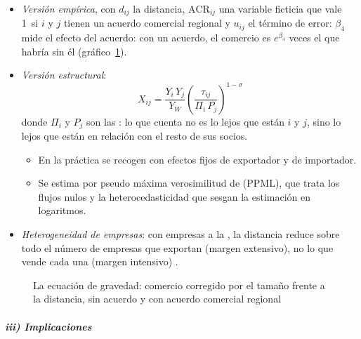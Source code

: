 \documentclass[11pt]{article}
\begin{document}
\begin{itemize}
\item \emph{Versión empírica}, con $d_{ij}$ la distancia, $\mathrm{ACR}_{ij}$ una variable ficticia que vale 1~si $i$ y $j$ tienen un acuerdo comercial regional y $u_{ij}$ el término de error:
  $\beta_4$ mide el efecto del acuerdo: con un acuerdo, el comercio es $e^{\beta_4}$ veces el que habría sin él (gráfico~\ref{fig:gravedad}).
\item \emph{Versión estructural}\nocite{AndersonVanWincoop2003}:
  \begin{equation}\label{eq:gravedad-estructural}
  X_{ij} = \frac{Y_i\,Y_j}{Y_W}\left(\frac{\tau_{ij}}{\Pi_i\,P_j}\right)^{1-\sigma}
  \end{equation}
  donde $\Pi_i$ y $P_j$ son las : lo que cuenta no es lo lejos que están $i$ y $j$, sino lo lejos que están en relación con el resto de sus socios.
  \begin{itemize}
  \item En la práctica se recogen con efectos fijos de exportador y de importador.
  \item Se estima por pseudo máxima verosimilitud de  (PPML), que trata los flujos nulos y la heterocedasticidad que sesgan la estimación en logaritmos\nocite{SantosSilvaTenreyro2006}.
  \end{itemize}
\item \emph{Heterogeneidad de empresas}: con empresas a la , la distancia reduce sobre todo el número de empresas que exportan (margen extensivo), no lo que vende cada una (margen intensivo)\nocite{Chaney2008,HelpmanMelitzRubinstein2008} .
\end{itemize}

\begin{figure}[H]
\centering
\caption{La ecuación de gravedad: comercio corregido por el tamaño frente a la distancia, sin acuerdo y con acuerdo comercial regional}\label{fig:gravedad}
\end{figure}

\subparagraph{iii) Implicaciones}
\end{document}
